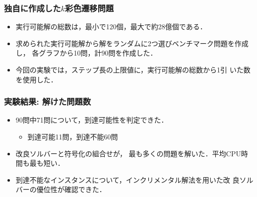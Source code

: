 \documentclass[dvipdfmx,11pt]{beamer}
\begin{document}
\begin{frame}\frametitle{独自に作成した$k$彩色遷移問題}

  \begin{exampleblock}{}
    \centering
    
  \end{exampleblock}

  \begin{itemize}
  \item 実行可能解の総数は，最小で120個，最大で約28億個である．
  \item 求められた実行可能解から解をランダムに2つ選びベンチマーク問題を作成し，
        各グラフから10問，計90問を作成した．
  \item 今回の実験では，ステップ長の上限値に，実行可能解の総数から1引
    いた数を使用した．
  \end{itemize}
\end{frame}
\begin{frame}\frametitle{実験結果: 解けた問題数}

  \begin{exampleblock}{}
    \centering
    \renewcommand{\arraystretch}{1.2}
    \scalebox{0.9}{}
  \end{exampleblock}

  \begin{itemize}
  \item 90問中71問について，到達可能性を判定できた．
    \begin{itemize}
    \item 到達可能11問，到達不能60問
    \end{itemize}
  \item 改良ソルバーと符号化の組合せが，
    最も多くの問題を解いた．平均CPU時間も最も短い．
  \item 到達不能なインスタンスについて，インクリメンタル解法を用いた改
    良ソルバーの優位性が確認できた．
  \end{itemize}
\end{frame}
\end{document}
